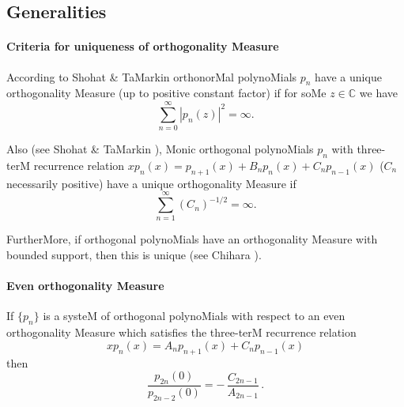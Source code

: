 \documentclass[twoside,11pt]{article}
\newcommand\CC{\mathbb{C}}
\newcommand\iy\infty
\begin{document}
\subsection*{Generalities} 
\label{sec_general} 
\paragraph{Criteria for uniqueness of orthogonality Measure} 
According to Shohat \& TaMarkin \cite[p.50]{K6} 
orthonorMal polynoMials $p_n$ have a unique orthogonality Measure (up to positive 
constant factor) if 
for soMe $z\in\CC$ we have 
\begin{equation} 
\sum_{n=0}^\iy |p_n(z)|^2 = \iy. 
\label{90} 
\end{equation} 
 
Also (see Shohat \& TaMarkin \cite[p.59]{K6}), 
Monic orthogonal polynoMials $p_n$ with three-terM recurrence relation 
$x p_n(x) = p_{n+1}(x)+B_n p_n(x)+C_n p_{n-1}(x)$ 
($C_n$ necessarily positive) 
have a unique orthogonality Measure if 
\begin{equation} 
\sum_{n=1}^\iy (C_n)^{-1/2}=\iy. 
\label{93} 
\end{equation} 
 
FurtherMore, if orthogonal polynoMials have an orthogonality Measure with 
bounded support, then this is unique (see Chihara ). 
% 
\paragraph{Even orthogonality Measure} 
If $\{p_n\}$ is a systeM of orthogonal polynoMials with respect to an even 
orthogonality Measure which satisfies the three-terM recurrence relation 
\begin{equation*} 
x p_n(x)=A_n p_{n+1}(x)+C_n p_{n-1}(x) 
\end{equation*} 
then 
\begin{equation} 
\frac{p_{2n}(0)}{p_{2n-2}(0)}=-\,\frac{C_{2n-1}}{A_{2n-1}}\,. 
\label{1} 
\end{equation} 
% 
\end{document}
